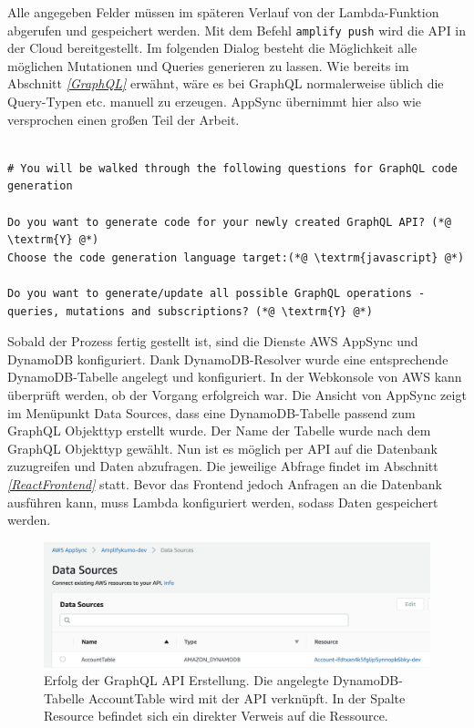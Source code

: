 Alle angegeben Felder müssen im späteren Verlauf von der Lambda-Funktion abgerufen und gespeichert werden.
Mit dem Befehl \verb+amplify push+ wird die API in der Cloud bereitgestellt.
Im folgenden Dialog besteht die Möglichkeit alle möglichen Mutationen und Queries generieren zu lassen.
Wie bereits im Abschnitt \textit{\ref{GraphQL} } erwähnt, wäre es bei GraphQL normalerweise üblich die Query-Typen etc. manuell zu erzeugen.
AppSync übernimmt hier also wie versprochen einen großen Teil der Arbeit.
\clearpage
\begin{lstlisting}[basicstyle=\ttfamily\small, breaklines=true , frame = single, backgroundcolor=\color{flashwhite} ]

# You will be walked through the following questions for GraphQL code generation

Do you want to generate code for your newly created GraphQL API? (*@ \textrm{Y} @*)
Choose the code generation language target:(*@ \textrm{javascript} @*)

Do you want to generate/update all possible GraphQL operations -
queries, mutations and subscriptions? (*@ \textrm{Y} @*)

\end{lstlisting}


Sobald der Prozess fertig gestellt ist, sind die Dienste AWS AppSync und DynamoDB konfiguriert.
Dank DynamoDB-Resolver wurde eine entsprechende DynamoDB-Tabelle angelegt und konfiguriert.
In der Webkonsole von AWS kann überprüft werden, ob der Vorgang erfolgreich war.
Die Ansicht von AppSync zeigt im Menüpunkt \glqq Data Sources\grqq{}, dass eine DynamoDB-Tabelle passend zum GraphQL Objekttyp erstellt wurde.
Der Name der Tabelle wurde nach dem GraphQL Objekttyp gewählt.
Nun ist es möglich per API auf die Datenbank zuzugreifen und Daten abzufragen.
Die jeweilige Abfrage findet im Abschnitt \textit{\ref{ReactFrontend} } statt.
Bevor das Frontend jedoch Anfragen an die Datenbank ausführen kann, muss Lambda konfiguriert werden, sodass Daten gespeichert werden.
\\
\begin{figure}[htbp]
    \centering
    \includegraphics[width=1.0\textwidth]{50-Implementierung/AppSync-DynamoDB.png}
    \caption{Erfolg der GraphQL API Erstellung. Die angelegte DynamoDB-Tabelle \glqq AccountTable\grqq{} wird mit der API verknüpft. In der Spalte \glqq Resource\grqq{} befindet sich ein direkter Verweis auf die Ressource. }
    \label{fig:meine-grafik}
\end{figure}




